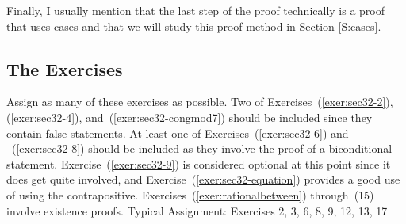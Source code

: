 Finally, I usually mention that the last step of the proof technically is a proof that uses cases and that we will study this proof method in Section \ref{S:cases}.
\hbreak 


\subsection*{The Exercises}
Assign as many of these exercises as possible.  Two of Exercises~(\ref{exer:sec32-2}), (\ref{exer:sec32-4}), and~(\ref{exer:sec32-congmod7}) should be included since they contain false statements. At least one of Exercises~(\ref{exer:sec32-6}) and ~(\ref{exer:sec32-8}) should be included as they involve the proof of a biconditional statement.  Exercise~(\ref{exer:sec32-9}) is considered optional at this point since it does get quite involved, and Exercise~(\ref{exer:sec32-equation}) provides a good use of using the contrapositive.  
Exercises~(\ref{exer:rationalbetween}) through~(15) involve existence proofs.
\vskip6pt
\noindent
Typical Assignment:  Exercises 2, 3, 6, 8, 9, 12, 13, 17


\hbreak
\endinput
